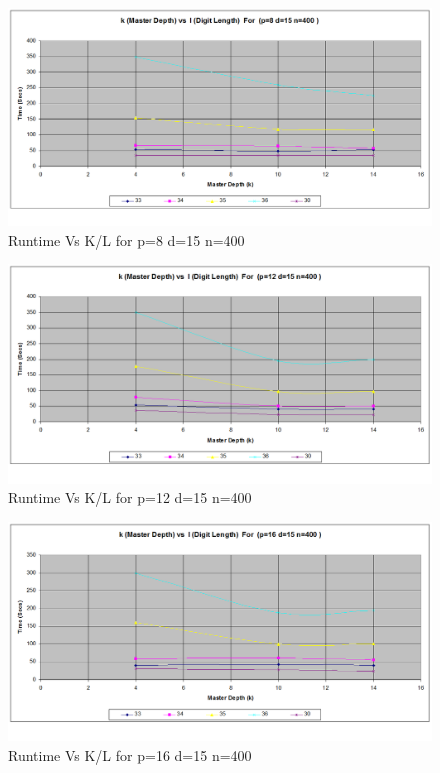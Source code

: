 \documentclass[twoside,11pt]{article}\usepackage{amsmath,amsfonts,amsthm,fullpage}
\begin{document}
\begin{figure}[!htbp]
\centering
\includegraphics[scale=.46]{images/pdn_p=8-d=15-n=400} 
\caption{Runtime Vs K/L for p=8 d=15 n=400}
\label{Runtime Vs K/L for p=8 d=15 n=400}
\end{figure}

\begin{figure}[!htbp]
\centering
\includegraphics[scale=.46]{images/pdn_p=12-d=15-n=400} 
\caption{Runtime Vs K/L for p=12 d=15 n=400}
\label{Runtime Vs K/L for p=12 d=15 n=400}
\end{figure}

\begin{figure}[!htbp]
\centering
\includegraphics[scale=.46]{images/pdn_p=16-d=15-n=400} 
\caption{Runtime Vs K/L for p=16 d=15 n=400}
\label{Runtime Vs K/L for p=16 d=15 n=400}
\end{figure}
\end{document}
